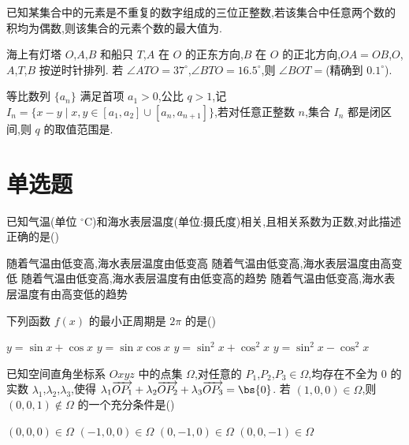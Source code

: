 \begin{problem}
已知某集合中的元素是不重复的数字组成的三位正整数,若该集合中任意两个数的积均为偶数,则该集合的元素个数的最大值为\fillinblank{}.
\end{problem}

\begin{problem}
海上有灯塔 \(O\),\(A\),\(B\) 和船只 \(T\),\(A\) 在 \(O\) 的正东方向,\(B\) 在 \(O\) 的正北方向,\(OA=OB\),\(O\),\(A\),\(T\),\(B\) 按逆时针排列. 若 \(\angle ATO=37^\circ\),\(\angle BTO=16.5^\circ\),则 \(\angle BOT=\)\fillinblank{}(精确到 \(0.1^\circ\)).

\end{problem}

\begin{problem}
等比数列 \(\{a_n\}\) 满足首项 \(a_1>0\),公比 \(q>1\),记 \(I_n=\{x-y\mid x,y\in [a_1,a_2]\cup [a_n,a_{n+1}]\}\),若对任意正整数 \(n\),集合 \(I_n\) 都是闭区间,则 \(q\) 的取值范围是\fillinblank{}.
\end{problem}

\section{单选题}

\begin{problem}
已知气温(单位 \(^{\circ}\mathrm C\))和海水表层温度(单位:摄氏度)相关,且相关系数为正数,对此描述正确的是(\quad)

\choices
    {随着气温由低变高,海水表层温度由低变高}
    {随着气温由低变高,海水表层温度由高变低}
    {随着气温由低变高,海水表层温度有由低变高的趋势}
    {随着气温由低变高,海水表层温度有由高变低的趋势}
\end{problem}

\begin{problem}
下列函数 \(f(x)\) 的最小正周期是 \(2\pi\) 的是(\quad)

\choices
    {\(y=\sin x+\cos x\)}
    {\(y=\sin x\cos x\)}
    {\(y=\sin^2 x+\cos^2 x\)}
    {\(y=\sin^2 x-\cos^2 x\)}
\end{problem}

\begin{problem}
已知空间直角坐标系 \(Oxyz\) 中的点集 \(\Omega\),对任意的 \(P_1\),\(P_2\),\(P_3\in \Omega\),均存在不全为 \(0\) 的实数 \(\lambda_1\),\(\lambda_2\),\(\lambda_3\),使得 \(\lambda_1\overrightarrow{OP_1}+\lambda_2\overrightarrow{OP_2}+\lambda_3\overrightarrow{OP_3}=\bs{0}\). 若 \((1,0,0)\in \Omega\),则 \((0,0,1)\notin \Omega\) 的一个充分条件是(\quad)

\choices
    {\((0,0,0)\in \Omega\)}
    {\((-1,0,0)\in \Omega\)}
    {\((0,-1,0)\in \Omega\)}
    {\((0,0,-1)\in \Omega\)}
\end{problem}

